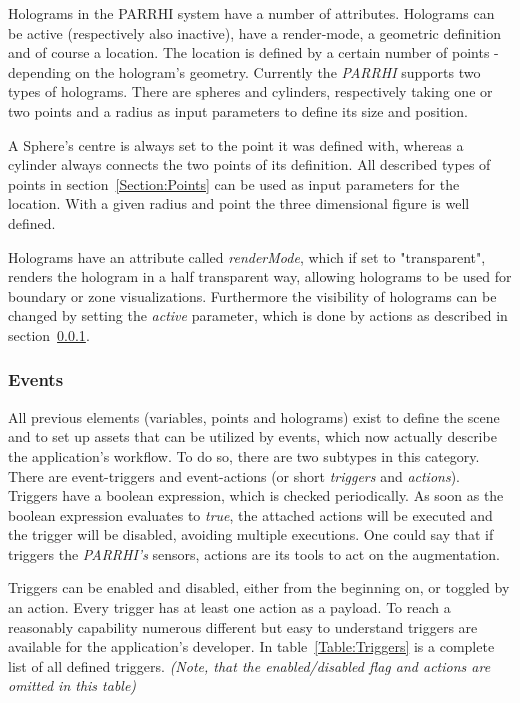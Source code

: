 Holograms in the PARRHI system have a number of attributes. Holograms can be active (respectively also inactive), have a render-mode, a geometric definition and of course a location. The location is defined by a certain number of points - depending on the hologram's geometry. Currently the \textit{PARRHI} supports two types of holograms. There are spheres and cylinders, respectively taking one or two points and a radius as input parameters to define its size and position.

A Sphere's centre is always set to the point it was defined with, whereas a cylinder always connects the two points of its definition. All described types of points in section~\ref{Section:Points} can be used as input parameters for the location. With a given radius and point the three dimensional figure is well defined.

Holograms have an attribute called \textit{renderMode}, which if set to "transparent", renders the hologram in a half transparent way, allowing holograms to be used for boundary or zone visualizations. Furthermore the visibility of holograms can be changed by setting the \textit{active} parameter, which is done by actions as described in section~\ref{Section:Events}.

\subsubsection{Events}\label{Section:Events}
All previous elements (variables, points and holograms) exist to define the scene and to set up assets that can be utilized by events, which now actually describe the application's workflow. To do so, there are two subtypes in this category. There are event-triggers and event-actions (or short \textit{triggers} and \textit{actions}). Triggers have a boolean expression, which is checked periodically. As soon as the boolean expression evaluates to \textit{true}, the attached actions will be executed and the trigger will be disabled, avoiding multiple executions. One could say that if triggers the \textit{PARRHI's} sensors, actions are its tools to act on the augmentation. 

Triggers can be enabled and disabled, either from the beginning on, or toggled by an action. Every trigger has at least one action as a payload. To reach a reasonably capability numerous different but easy to understand triggers are available for the application's developer. In table~\ref{Table:Triggers} is a complete list of all defined triggers. \textit{(Note, that the enabled/disabled flag and actions are omitted in this table)}

